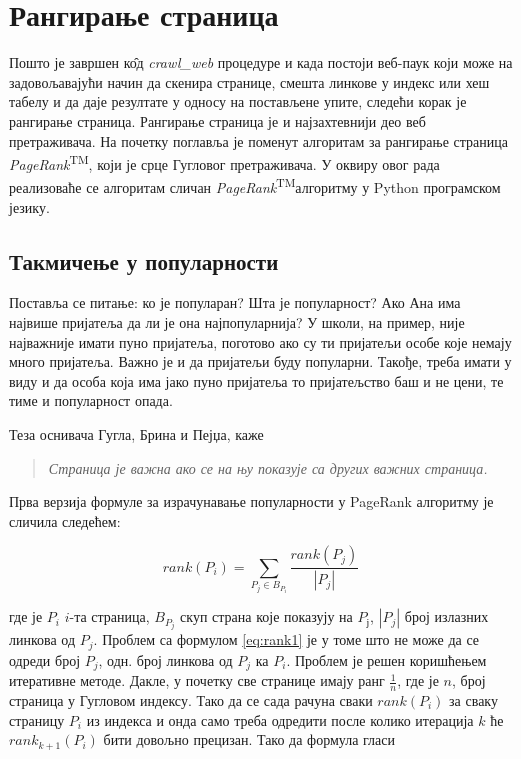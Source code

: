 \section{Рангирање страница}

Пошто је завршен к\^{о}д \emph{crawl\_web} процедуре и када постоји веб-паук који може на задовољавајући начин да скенира странице, смешта линкове у индекс или хеш табелу и да даје резултате у односу на постављене упите, следећи корак је рангирање страница. Рангирање страница је и најзахтевнији део веб претраживача. На почетку поглавља је поменут алгоритам за рангирање страница \emph{PageRank}\textsuperscript{TM}, који је срце Гугловог претраживача. У оквиру овог рада реализоваће се алгоритам сличан \emph{PageRank}\textsuperscript{TM}алгоритму у Python програмском језику.

\subsection{Такмичење у популарности}
Поставља се питање: ко је популаран? Шта је популарност? Ако Ана има највише пријатеља да ли је она најпопуларнија? У школи, на пример, није најважније имати пуно пријатеља, поготово ако су ти пријатељи особе које немају много пријатеља. Важно је и да пријатељи буду популарни. Такође, треба имати у виду и да особа која има јако пуно пријатеља то пријатељство баш и не цени, те тиме и популарност опада.

Теза оснивача Гугла, Брина и Пејџа, каже\cite[Ch 4]{langville2011google}

\begin{quote}
\textit{Страница је важна ако се на њу показује са других важних страница.}
\end{quote}

Прва верзија формуле за израчунавање популарности у PageRank алгоритму је сличила следећем:

\begin{equation}\label{eq:rank1}
rank(P_{i})=\sum_{P_{j}\in B_{P_{i}}}\frac{rank(P_{j})}{\left |P_{j}  \right |}
\end{equation}

где је $P_{i}$ $i$-та страница, $B_{P_{j}}$ скуп страна које показују на $P_{ј}$, $\left |P_{j}  \right |$ број излазних линкова од $P_{j}$. Проблем са формулом \ref{eq:rank1} је у томе што не може да се одреди број $P_{j}$, одн. број линкова од $P_{j}$ ка $P_{i}$. Проблем је решен коришћењем итеративне методе. Дакле, у почетку све странице имају ранг $\frac{1}{n}$, где је $n$, број страница у Гугловом индексу. Тако да се сада рачуна сваки $rank(P_{i})$ за сваку страницу $P_{i}$ из индекса и онда само треба одредити после колико итерација $k$ ће $rank_{k+1}(P_{i})$ бити довољно прецизан. Тако да формула гласи\cite[Ch 4.1]{langville2011google}

